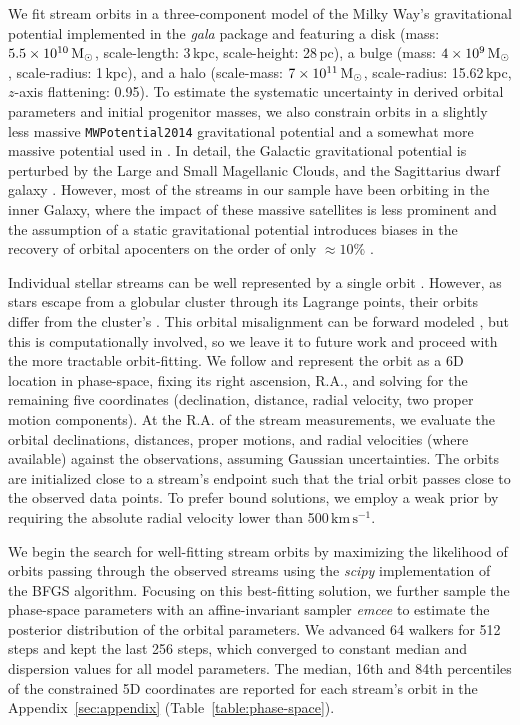 \documentclass[twocolumn]{aastex63}
\newcommand{\package}[1]{\textsl{#1}}
\newcommand{\kms}{\ensuremath{\textrm{km}\,\textrm{s}^{-1}}}
\begin{document}
We fit stream orbits in a three-component model of the Milky Way's gravitational potential implemented in the \package{gala} package \citep{gala} and featuring a \citet{mn:1975} disk (mass: $5.5\times10^{10}\rm\, M_\odot$, scale-length: 3\,kpc, scale-height: 28\,pc), a \citet{hernquist:1990} bulge (mass: $4\times10^9\rm\, M_\odot$, scale-radius: 1\,kpc), and a \citet{nfw:1997} halo (scale-mass: $7\times10^{11}\rm\, M_\odot$, scale-radius: 15.62\,kpc, $z$-axis flattening: 0.95).
To estimate the systematic uncertainty in derived orbital parameters and initial progenitor masses, we also constrain orbits in a slightly less massive \texttt{MWPotential2014} gravitational potential \citep{bovy:2015} and a somewhat more massive potential used in \citet{pwb}.
In detail, the Galactic gravitational potential is perturbed by the Large and Small Magellanic Clouds, and the Sagittarius dwarf galaxy \citep{gomez:2015, erkal:2019, vasiliev:2020}.
However, most of the streams in our sample have been orbiting in the inner Galaxy, where the impact of these massive satellites is less prominent \citep{petersen:2020} and the assumption of a static gravitational potential introduces biases in the recovery of orbital apocenters on the order of only $\approx10\%$ \citep{garrow:2020}.


Individual stellar streams can be well represented by a single orbit \citep[e.g.,][]{koposov:2010, pwb, ibata:2019}.
However, as stars escape from a globular cluster through its Lagrange points, their orbits differ from the cluster's \citep{eyre:2011}.
This orbital misalignment can be forward modeled \citep{varghese:2011, bonaca:2014, sanders:2014}, but this is computationally involved, so we leave it to future work and proceed with the more tractable orbit-fitting.
We follow \citet{pwb} and represent the orbit as a 6D location in phase-space, fixing its right ascension, R.A., and solving for the remaining five coordinates (declination, distance, radial velocity, two proper motion components).
At the R.A. of the stream measurements, we evaluate the orbital declinations, distances, proper motions, and radial velocities (where available) against the observations, assuming Gaussian uncertainties.
The orbits are initialized close to a stream's endpoint such that the trial orbit passes close to the observed data points.
To prefer bound solutions, we employ a weak prior by requiring the absolute radial velocity lower than 500\,\kms.

We begin the search for well-fitting stream orbits by maximizing the likelihood of orbits passing through the observed streams using the \package{scipy} implementation of the BFGS algorithm.
Focusing on this best-fitting solution, we further sample the phase-space parameters with an affine-invariant sampler \package{emcee} to estimate the posterior distribution of the orbital parameters.
We advanced 64 walkers for 512 steps and kept the last 256 steps, which converged to constant median and dispersion values for all model parameters.
The median, 16th and 84th percentiles of the constrained 5D coordinates are reported for each stream's orbit in the Appendix~\ref{sec:appendix} (Table~\ref{table:phase-space}).
\end{document}
